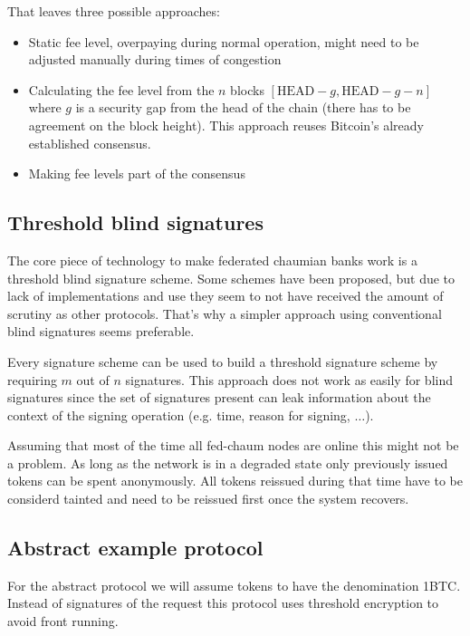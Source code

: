 \documentclass[10pt,a4paper,twocolumn]{article}
\begin{document}
That leaves three possible approaches:
\begin{itemize}
	\item Static fee level, overpaying during normal operation, might need to be adjusted manually during times of congestion
	\item Calculating the fee level from the $n$ blocks $[\text{HEAD}-g,\text{HEAD}-g-n]$ where $g$ is a security gap from the head of the chain (there has to be agreement on the block height). This approach reuses Bitcoin's already established consensus.
	\item Making fee levels part of the consensus
\end{itemize}

\subsection{Threshold blind signatures}
The core piece of technology to make federated chaumian banks work is a threshold blind signature scheme.
Some schemes have been proposed, but due to lack of implementations and use they seem to not have received the amount of scrutiny as other protocols.
That's why a simpler approach using conventional blind signatures seems preferable. %

Every signature scheme can be used to build a threshold signature scheme by requiring $m$ out of $n$ signatures. This approach does not work as easily for blind signatures since the set of signatures present can leak information about the context of the signing operation (e.g. time, reason for signing, $\dots$).

Assuming that most of the time all fed-chaum nodes are online this might not be a problem. As long as the network is in a degraded state only previously issued tokens can be spent anonymously. All tokens reissued during that time have to be considerd tainted and need to be reissued first once the system recovers.

\subsection{Abstract example protocol}
For the abstract protocol we will assume tokens to have the denomination 1BTC. Instead of signatures of the request this protocol uses threshold encryption to avoid front running.
\end{document}
